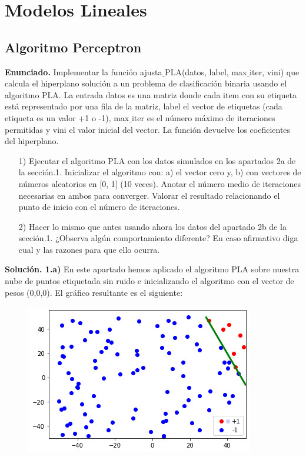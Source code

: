 \documentclass[a4paper,11pt]{article}
\begin{document}
\section{Modelos Lineales}

\subsection{Algoritmo Perceptron}

\textbf{Enunciado.} Implementar la función ajusta$\_$PLA(datos, label, max$\_$iter, vini) que calcula el hiperplano solución a un problema de clasificación binaria usando el algoritmo PLA. La entrada datos es una matriz donde cada item con su etiqueta está representado por una fila de la matriz, label el vector de etiquetas (cada etiqueta es un valor +1 o -1), max$\_$iter es el número máximo de iteraciones permitidas y vini el valor inicial del vector. La función devuelve los coeficientes del hiperplano.

\begin{itemize}

\item[1)] Ejecutar el algoritmo PLA con los datos simulados en los apartados 2a de la sección.1. Inicializar el algoritmo con: a) el vector cero y, b) con vectores de
números aleatorios en [0, 1] (10 veces). Anotar el número medio de iteraciones necesarias en ambos para converger. Valorar el resultado relacionando el punto de inicio con el número de iteraciones.

\item[2)] Hacer lo mismo que antes usando ahora los datos del apartado 2b de la sección.1. ¿Observa algún comportamiento diferente? En caso afirmativo diga cual y las
razones para que ello ocurra.

\end{itemize}

\textbf{Solución. 1.a)} En este apartado hemos aplicado el algoritmo PLA sobre nuestra nube de puntos etiquetada sin ruido e inicializando el algoritmo con el vector de pesos (0,0,0). El gráfico resultante es el siguiente: 

\begin{figure}[h]
\includegraphics[scale=0.7]{ej2a1a}
\centering
\end{figure}
\end{document}
